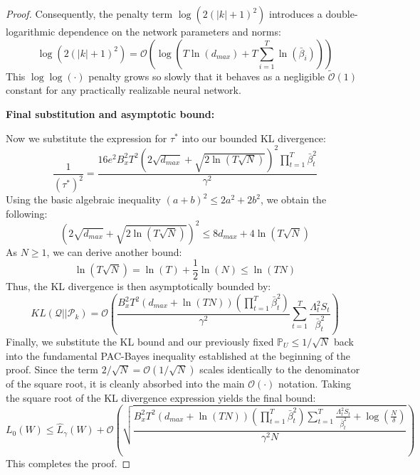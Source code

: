 \documentclass[a4paper,14pt]{extarticle}
\begin{document}
\begin{proof}
        Consequently, the penalty term $\log(2(|k|+1)^2)$ introduces a double-logarithmic dependence on the network parameters and norms:
        $$ \log(2(|k|+1)^2) = \mathcal{O} \left( \log\left( T \ln(d_{max}) + T \sum_{i=1}^T \ln(\bar{\beta}_i) \right) \right) $$
        This $\log\log(\cdot)$ penalty grows so slowly that it behaves as a negligible $\tilde{\mathcal{O}}(1)$ constant for any practically realizable neural network.


        \textbf{Final substitution and asymptotic bound:} 

        Now we substitute the expression for $\tau^*$ into our bounded KL divergence:
        $$ \frac{1}{(\tau^*)^2} = \frac{16 e^2 B_x^2 T^2 \left(2\sqrt{d_{max}} + \sqrt{2 \ln(T \sqrt{N})}\right)^2 \prod_{t=1}^T \bar{\beta}_t^2}{\gamma^2} $$
        Using the basic algebraic inequality $(a+b)^2 \leqslant 2a^2 + 2b^2$, we obtain the following:
        $$ \left(2\sqrt{d_{max}} + \sqrt{2 \ln(T \sqrt{N})}\right)^2 \leqslant 8 d_{max} + 4 \ln(T \sqrt{N}) $$
        As $N \geqslant 1$, we can derive another bound:
        $$\ln(T \sqrt{N}) = \ln(T) + \frac{1}{2}\ln(N) \leqslant \ln(TN)$$
        Thus, the KL divergence is then asymptotically bounded by:
        $$ KL(\mathcal{Q} || \mathcal{P}_k) = \mathcal{O} \left( \frac{B_x^2 T^2 (d_{max} + \ln(TN)) \left( \prod_{t=1}^T \bar{\beta}_t^2 \right)}{\gamma^2} \sum_{t=1}^T \frac{\Lambda_t^2 S_t}{\bar{\beta}_t^2} \right) $$
        Finally, we substitute the KL bound and our previously fixed $\mathbb{P}_U \leqslant 1/\sqrt{N}$ back into the fundamental PAC-Bayes inequality established at the beginning of the proof. Since the term $2/\sqrt{N} = \mathcal{O}(1/\sqrt{N})$ scales identically to the denominator of the square root, it is cleanly absorbed into the main $\mathcal{O}(\cdot)$ notation. Taking the square root of the KL divergence expression yields the final bound:
        $$ L_0(W) \leqslant \hat{L}_\gamma(W) + \mathcal{O} \left( \sqrt{\frac{ B_x^2 T^2 (d_{max} + \ln(TN)) \left( \prod_{t=1}^T \bar{\beta}_t^2 \right) \sum_{t=1}^T \frac{\Lambda_t^2 S_t}{\bar{\beta}_t^2} + \log\left(\frac{N}{\delta}\right) }{\gamma^2 N}} \right) $$
        This completes the proof.

    \end{proof}
\end{document}
